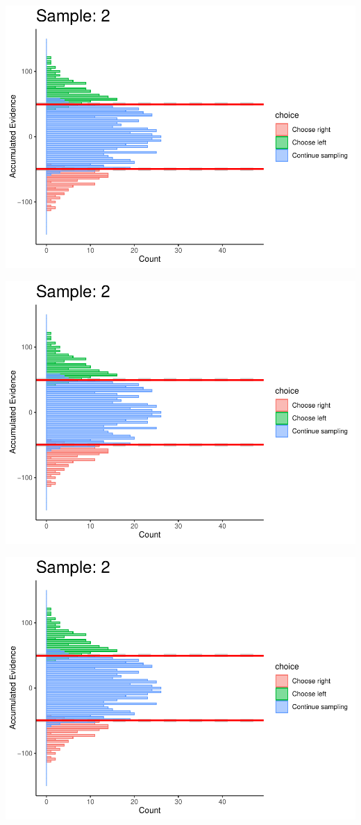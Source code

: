 \documentclass[
]{book}
\begin{document}
\begin{center}\includegraphics[width=0.8\linewidth]{LateNightBayes_files/figure-latex/fixed_dcb-13} \end{center}

\begin{center}\includegraphics[width=0.8\linewidth]{LateNightBayes_files/figure-latex/fixed_dcb-14} \end{center}

\begin{center}\includegraphics[width=0.8\linewidth]{LateNightBayes_files/figure-latex/fixed_dcb-15} \end{center}
\end{document}

